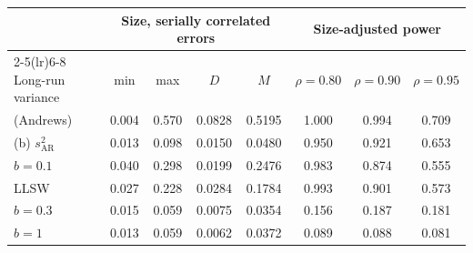 \begin{tabular}{lccccccc}
\toprule
& \multicolumn{4}{c}{Size, serially correlated errors} & \multicolumn{3}{c}{Size-adjusted power} \\
\cmidrule(lr){2-5}\cmidrule(lr){6-8}
Long-run variance & min & max & $D$ & $M$ & $\rho = 0.80$ & $\rho = 0.90$ & $\rho = 0.95$ \\
\midrule
\RMGLS{} (Andrews) & 0.004 & 0.570 & 0.0828 & 0.5195 & 1.000 & 0.994 & 0.709 \\
(b) $s^2_{\mathrm{AR}}$ & 0.013 & 0.098 & 0.0150 & 0.0480 & 0.950 & 0.921 & 0.653 \\
$b = 0.1$ & 0.040 & 0.298 & 0.0199 & 0.2476 & 0.983 & 0.874 & 0.555 \\
LLSW & 0.027 & 0.228 & 0.0284 & 0.1784 & 0.993 & 0.901 & 0.573 \\
$b = 0.3$ & 0.015 & 0.059 & 0.0075 & 0.0354 & 0.156 & 0.187 & 0.181 \\
$b = 1$ & 0.013 & 0.059 & 0.0062 & 0.0372 & 0.089 & 0.088 & 0.081 \\
\bottomrule
\end{tabular}
